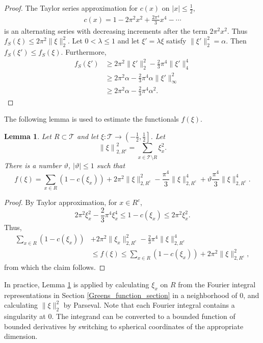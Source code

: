 \documentclass[a4paper, 12pt, notitlepage]{amsart}
\newcommand{\sT}{\mathscr{T}}
\newtheorem{lemma}[theorem]{Lemma}
\theoremstyle{remark}
\begin{document}
\begin{proof}
The Taylor series approximation for $c(x)$ on $|x| \leq \frac{1}{2}$,
\begin{align*}
 c(x) = 1 - 2 \pi^2 x^2 + \frac{2\pi^4}{3} x^4 - \cdots
\end{align*}
 is an alternating series with decreasing increments  after the term $2\pi^2 x^2$.  Thus $f_S(\xi) \leq 2\pi^2 \|\xi\|_2^2$. 
 Let $0 < \lambda \leq 1$ and let $\xi' = \lambda \xi$ satisfy  $\| \xi'\|_2^2 = \alpha$.  Then $f_S(\xi') \leq f_S(\xi)$.  Furthermore, 
 \begin{align*}
f_S(\xi') &\geq 2\pi^2 \|\xi'\|_2^2 - \frac{2}{3}\pi^4 \|\xi'\|_4^4 \\&\geq 2\pi^2 \alpha - \frac{2}{3} \pi^4 \alpha \|\xi'\|_\infty^2 \\&\geq 2\pi^2 \alpha - \frac{2}{3}\pi^4 \alpha^2.
 \end{align*}
\end{proof}
The following lemma is used to estimate the functionals $f(\xi)$.
\begin{lemma}\label{f_approx_lemma}
 Let $R \subset \sT$ and let $\xi: \sT \to \left(-\frac{1}{2}, \frac{1}{2}\right]$. Let 
 \begin{equation}
\left\|\xi\right\|_{2, R^c}^2 = \sum_{x \in \sT \setminus R} \xi_x^2.  
 \end{equation}
 There is a number $\vartheta$, $|\vartheta| \leq 1$ such that
 \begin{equation}
  f(\xi) = \sum_{x \in R}\left( 1-c(\xi_x)\right) +2\pi^2 \|\xi\|_{2, R^c}^2 - \frac{\pi^4}{3} \|\xi\|_{2,R^c}^4 + \vartheta \frac{\pi^4}{3}\|\xi\|_{2,R^c}^4.
 \end{equation}

\end{lemma}
\begin{proof}
 By Taylor approximation, for $x \in R^c$, \begin{equation*}2\pi^2 \xi_x^2 - \frac{2}{3} \pi^4 \xi_x^4 \leq 1-c(\xi_x) \leq 2\pi^2 \xi_x^2.\end{equation*}  Thus,
 \begin{align*}
  \sum_{x \in R} (1-c(\xi_x))& + 2\pi^2 \|\xi_x\|_{2,R^c}^2 - \frac{2}{3}\pi^4 \|\xi\|_{2, R^c}^4 \\&\leq f(\xi) \leq \sum_{x \in R} (1-c(\xi_x)) + 2\pi^2 \|\xi\|_{2,R^c}^2,
 \end{align*}
from which the claim follows.
\end{proof}
In practice, Lemma \ref{f_approx_lemma} is applied by calculating $\xi_x$ on $R$ from the Fourier integral representations in Section \ref{Greens_function_section} in a neighborhood of 0, and calculating $\|\xi\|_2^2$ by Parseval.  Note that each Fourier integral contains a singularity at 0.  The integrand can be converted to a bounded function of bounded derivatives by switching to spherical coordinates of the appropriate dimension.
\end{document}
